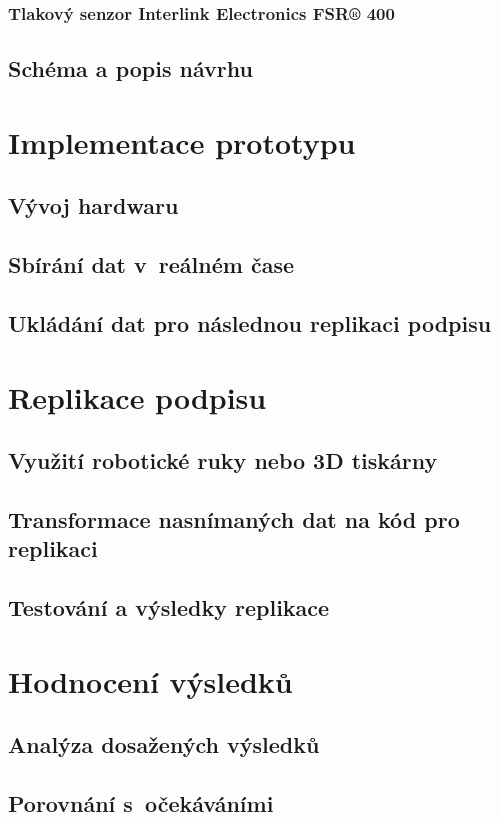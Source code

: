 \subsection{Tlakový senzor Interlink Electronics FSR® 400}
\section{Schéma a popis návrhu}

\chapter{Implementace prototypu}
\section{Vývoj hardwaru}
\section{Sbírání dat v~reálném čase}
\section{Ukládání dat pro následnou replikaci podpisu}

\chapter{Replikace podpisu}
\section{Využití robotické ruky nebo 3D tiskárny}
\section{Transformace nasnímaných dat na kód pro replikaci}
\section{Testování a výsledky replikace}

\chapter{Hodnocení výsledků}
\section{Analýza dosažených výsledků}
\section{Porovnání s~očekáváními}
